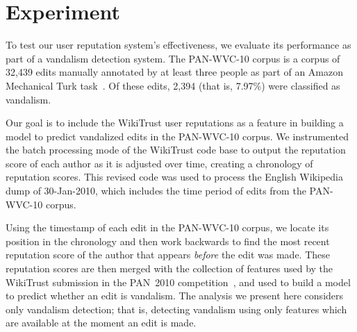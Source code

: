 \section{Experiment}

To test our user reputation system's effectiveness, we
evaluate its performance as part of a vandalism
detection system.
The PAN-WVC-10 corpus is a corpus of 32,439 edits manually
annotated by at least three people as part of an Amazon
Mechanical Turk task~\cite{Potthast2010a}.
Of these edits, 2,394 (that is, 7.97\%) were classified as vandalism.

Our goal is to include the WikiTrust user reputations as a
feature in building a model to predict vandalized edits in
the PAN-WVC-10 corpus.
We instrumented the batch processing mode of the WikiTrust
code base to output the reputation score of each author as
it is adjusted over time, creating a chronology of reputation scores.
This revised code was used to process the English Wikipedia
dump of 30-Jan-2010, which includes the time period of
edits from the PAN-WVC-10 corpus.

Using the timestamp of each edit in the PAN-WVC-10 corpus,
we locate its position in the chronology and then work backwards
to find the most recent reputation score of the author
that appears \textit{before} the edit was made.
These reputation scores are then merged with the collection
of features used by the WikiTrust submission in the PAN~2010
competition~\cite{Adler2010b}, and used to build a model to predict
whether an edit is vandalism.
The analysis we present here considers only  vandalism
detection; that is, detecting vandalism using only features which are
available at the moment an edit is made.


